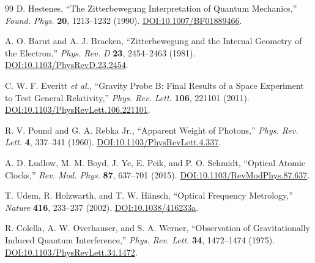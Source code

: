 \documentclass[%
 reprint,
 amsmath,amssymb,
 aps,
]{revtex4-1}
\numberwithin{equation}{section}%
\begin{document}
\begin{thebibliography}{99}
D. Hestenes,
``The Zitterbewegung Interpretation of Quantum Mechanics,''
\textit{Found. Phys.} \textbf{20}, 1213--1232 (1990).
\href{https://doi.org/10.1007/BF01889466}{DOI:10.1007/BF01889466}.

A. O. Barut and A. J. Bracken,
``Zitterbewegung and the Internal Geometry of the Electron,''
\textit{Phys. Rev. D} \textbf{23}, 2454--2463 (1981).
\href{https://doi.org/10.1103/PhysRevD.23.2454}{DOI:10.1103/PhysRevD.23.2454}.

C. W. F. Everitt \textit{et al.},
``Gravity Probe B: Final Results of a Space Experiment to Test General Relativity,''
\textit{Phys. Rev. Lett.} \textbf{106}, 221101 (2011).
\href{https://doi.org/10.1103/PhysRevLett.106.221101}{DOI:10.1103/PhysRevLett.106.221101}.

R. V. Pound and G. A. Rebka Jr.,
``Apparent Weight of Photons,''
\textit{Phys. Rev. Lett.} \textbf{4}, 337--341 (1960).
\href{https://doi.org/10.1103/PhysRevLett.4.337}{DOI:10.1103/PhysRevLett.4.337}.

A. D. Ludlow, M. M. Boyd, J. Ye, E. Peik, and P. O. Schmidt,
``Optical Atomic Clocks,''
\textit{Rev. Mod. Phys.} \textbf{87}, 637--701 (2015).
\href{https://doi.org/10.1103/RevModPhys.87.637}{DOI:10.1103/RevModPhys.87.637}.

T. Udem, R. Holzwarth, and T. W. Hänsch,
``Optical Frequency Metrology,''
\textit{Nature} \textbf{416}, 233--237 (2002).
\href{https://doi.org/10.1038/416233a}{DOI:10.1038/416233a}.

R. Colella, A. W. Overhauser, and S. A. Werner,
``Observation of Gravitationally Induced Quantum Interference,''
\textit{Phys. Rev. Lett.} \textbf{34}, 1472--1474 (1975).
\href{https://doi.org/10.1103/PhysRevLett.34.1472}{DOI:10.1103/PhysRevLett.34.1472}.

\end{thebibliography}

\end{document}
